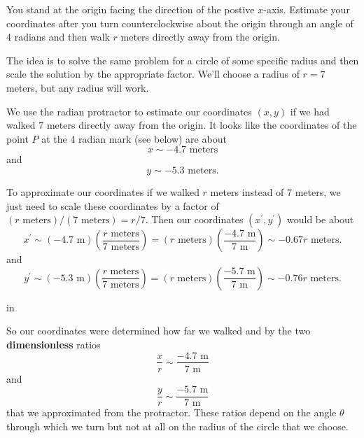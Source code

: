 \documentclass{ximera}
\newcommand{\pskip}{\vskip 0.1 in}
\begin{document}
\begin{question} \label{Q2435r6:Cosine}

You stand at the origin facing the direction of the postive $x$-axis. Estimate your coordinates after you turn counterclockwise about the origin through an angle of 4 radians and then walk $r$ meters directly away from the origin.

\begin{explanation}
The idea is to solve the same problem for a circle of some specific radius and then scale the solution by the appropriate factor. We'll choose a radius of $r=7$ meters, but any radius will work.

We use the radian protractor to estimate our coordinates $(x, y)$ if we had walked $7$ meters directly away from the origin.  It looks like the coordinates of the point $P$ at the 4 radian mark (see below) are about 
\[
   x\sim -4.7 \text{ meters}
\]
and 
\[
  y\sim -5.3 \text{ meters}.
\]

To approximate our coordinates if we walked $r$ meters instead of $7$ meters, we just need to scale these coordinates by a factor of $(r\text{ meters})/(7\text{ meters}) = r/7$. Then our coordinates $(x^\prime,y^\prime)$ would be about
\[
   x^\prime \sim (-4.7\text{ m}) \left( \frac{r\text{ meters}}{7\text{ meters}} \right) = (r \text{ meters})\left( \frac{-4.7\text{ m}}{7\text{ m}}\right) \sim  -0.67r   \text{ meters}.
\]
and
\[
   y^\prime   \sim (-5.3\text{ m}) \left( \frac{r\text{ meters}}{7\text{ meters}} \right) = (r \text{ meters})\left( \frac{-5.7\text{ m}}{7\text{ m}}\right) \sim   -0.76 r \text{ meters}.
\]

 
\begin{onlineOnly}
    \begin{center}
\end{center}
\end{onlineOnly}
\end{explanation}

\pskip

So our coordinates were determined how far we walked and by the two {\bf dimensionless} ratios
\[
    \frac{x}{r} \sim \frac{-4.7\text{ m}}{7\text{ m}}
\] 
and
\[
   \frac{y}{r} \sim \frac{-5.7\text{ m}}{7\text{ m}}
\]
that we approximated from the protractor. These ratios depend on the angle $\theta$ through which we turn but not at all on the radius of the circle that we choose. 


\end{question}
\end{document}

